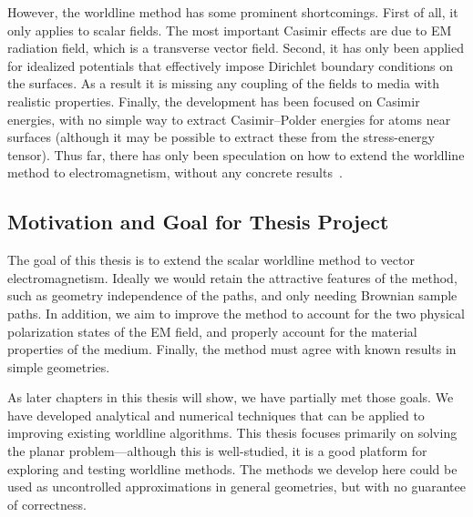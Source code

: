 
However, the worldline method has some prominent shortcomings.  First of all, it only applies 
to scalar fields.
  The most important Casimir effects are due to EM radiation field, 
which is a transverse vector field.
  Second, it has only been applied for idealized potentials that effectively impose 
Dirichlet boundary conditions on the surfaces.  As a result it is missing any 
coupling of the fields to media with realistic properties.
Finally, the development has been focused on Casimir energies, with no simple way to 
extract Casimir--Polder energies for atoms near surfaces 
(although it may be possible to extract these from the stress-energy tensor). 
Thus far, there has only been speculation on how to extend the worldline method to 
electromagnetism, without any concrete results~\citep{Aehlig2011}.  


\subsection{Motivation and Goal for Thesis Project}

The goal of this thesis is to extend the scalar worldline method to vector electromagnetism.
Ideally we would retain the attractive features of the method, such as geometry independence of the paths,
and only needing Brownian sample paths.
In addition, we aim to improve the method to account for the two physical polarization
states of the EM field, and properly account for the material properties of the medium.  
Finally, the method must agree with known results in simple geometries.  

As later chapters in this thesis will show, we have partially met those goals.  We have developed analytical
and numerical techniques that can be applied to improving existing worldline algorithms.
This thesis focuses primarily on solving the planar problem---although this is well-studied,
it is a good platform for exploring and testing worldline methods.  
The methods we develop here could be used as uncontrolled approximations in general geometries, but with
no guarantee of correctness.  

